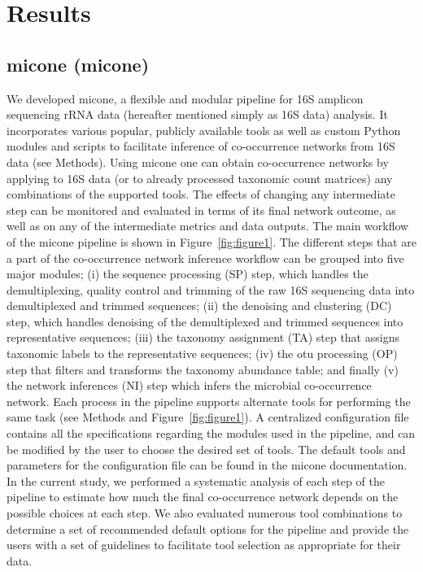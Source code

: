 
\section*{Results}

  \subsection*{\acl{micone} (\acs{micone})}

  We developed \ac{micone}, a flexible and modular pipeline for 16S amplicon sequencing rRNA data (hereafter mentioned simply as 16S data) analysis.
  It incorporates various popular, publicly available tools as well as custom Python modules and scripts to facilitate inference of co-occurrence networks from 16S data (see Methods).
  Using \ac{micone} one can obtain co-occurrence networks by applying to 16S data (or to already processed taxonomic count matrices) any combinations of the supported tools.
  The effects of changing any intermediate step can be monitored and evaluated in terms of its final network outcome, as well as on any of the intermediate metrics and data outputs.
  The main workflow of the \ac{micone} pipeline is shown in Figure~\ref{fig:figure1}.
  The different steps that are a part of the co-occurrence network inference workflow can be grouped into five major modules; (i) the sequence processing (SP) step, which handles the demultiplexing, quality control and trimming of the raw 16S sequencing data into demultiplexed and trimmed sequences; (ii) the denoising and clustering (DC) step, which handles denoising of the demultiplexed and trimmed sequences into representative sequences; (iii) the taxonomy assignment (TA) step that assigns taxonomic labels to the representative sequences; (iv) the \ac{otu} processing (OP) step that filters and transforms the taxonomy abundance table; and finally (v) the network inferences (NI) step which infers the microbial co-occurrence network.
  Each process in the pipeline supports alternate tools for performing the same task (see Methods and Figure~\ref{fig:figure1}).
  A centralized configuration file contains all the specifications regarding the modules used in the pipeline, and can be modified by the user to choose the desired set of tools.
  The default tools and parameters for the configuration file can be found in the \ac{micone} documentation.
  In the current study, we performed a systematic analysis of each step of the pipeline to estimate how much the final co-occurrence network depends on the possible choices at each step.
  We also evaluated numerous tool combinations to determine a set of recommended default options for the pipeline and provide the users with a set of guidelines to facilitate tool selection as appropriate for their data.

